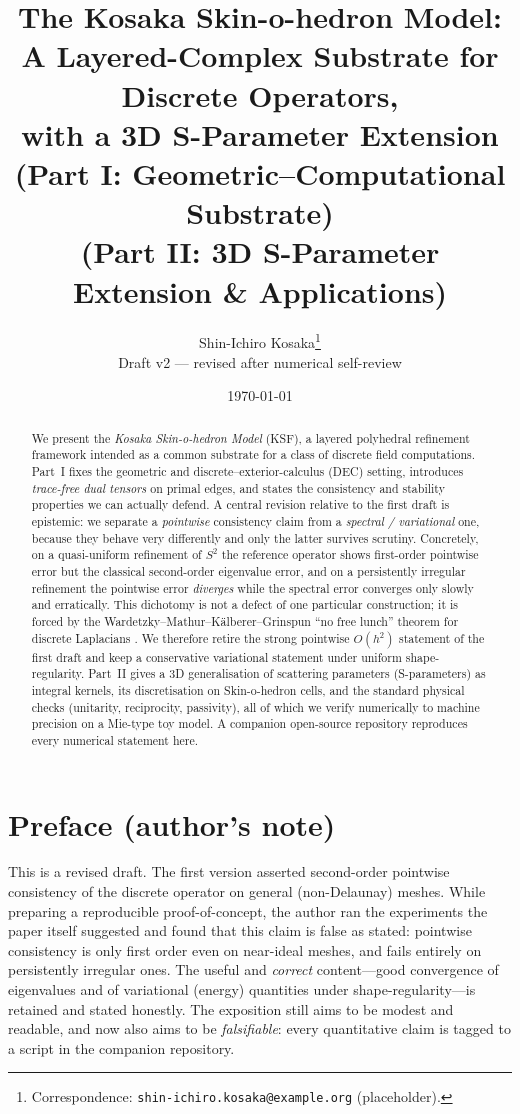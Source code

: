 \documentclass[11pt]{article}
\title{The Kosaka Skin-o-hedron Model:\\
A Layered-Complex Substrate for Discrete Operators,\\
with a 3D S-Parameter Extension\\
\large{(Part I: Geometric--Computational Substrate)\\
(Part II: 3D S-Parameter Extension \& Applications)}}
\author{Shin-Ichiro Kosaka\thanks{Correspondence: \texttt{shin-ichiro.kosaka@example.org} (placeholder).}\\
\vspace{4pt}
\normalsize{Draft v2 --- revised after numerical self-review}}
\date{\today}
\theoremstyle{plain}
\theoremstyle{definition}
\theoremstyle{remark}
\newcommand{\Order}{O}
\begin{document}
\maketitle

\begin{abstract}
We present the \emph{Kosaka Skin-o-hedron Model} (KSF), a layered polyhedral
refinement framework intended as a common substrate for a class of discrete
field computations. Part~I fixes the geometric and discrete--exterior-calculus
(DEC) setting, introduces \emph{trace-free dual tensors} on primal edges, and
states the consistency and stability properties we can actually defend. A
central revision relative to the first draft is epistemic: we separate a
\emph{pointwise} consistency claim from a \emph{spectral / variational} one,
because they behave very differently and only the latter survives scrutiny.
Concretely, on a quasi-uniform refinement of $S^2$ the reference operator shows
first-order pointwise error but the classical second-order eigenvalue error,
and on a persistently irregular refinement the pointwise error \emph{diverges}
while the spectral error converges only slowly and erratically. This dichotomy is not a defect of one
particular construction; it is forced by the Wardetzky--Mathur--Kälberer--Grinspun
``no free lunch'' theorem for discrete Laplacians \citep{wardetzky2007discrete}.
We therefore retire the strong pointwise $\Order(h^2)$ statement of the first
draft and keep a conservative variational statement under uniform
shape-regularity. Part~II gives a 3D generalisation of scattering parameters
(S-parameters) as integral kernels, its discretisation on Skin-o-hedron cells,
and the standard physical checks (unitarity, reciprocity, passivity), all of
which we verify numerically to machine precision on a Mie-type toy model.
A companion open-source repository reproduces every numerical statement here.
\end{abstract}

\tableofcontents
\bigskip

\section*{Preface (author's note)}
This is a revised draft. The first version asserted second-order pointwise
consistency of the discrete operator on general (non-Delaunay) meshes. While
preparing a reproducible proof-of-concept, the author ran the experiments the
paper itself suggested and found that this claim is false as stated: pointwise
consistency is only first order even on near-ideal meshes, and fails entirely
on persistently irregular ones. The useful and \emph{correct} content---good
convergence of eigenvalues and of variational (energy) quantities under
shape-regularity---is retained and stated honestly. The exposition still aims to
be modest and readable, and now also aims to be \emph{falsifiable}: every
quantitative claim is tagged to a script in the companion repository.
\end{document}
